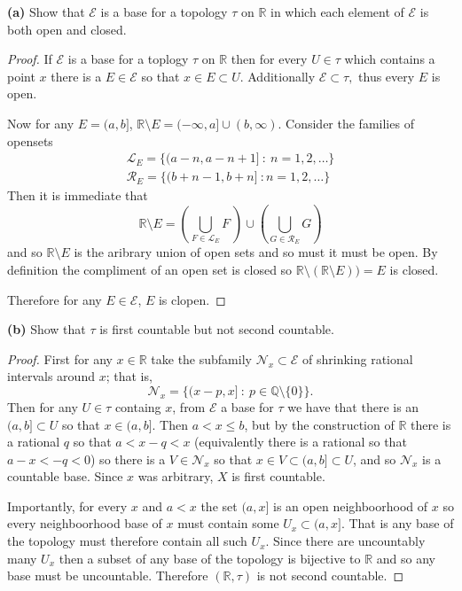 \documentclass[11pt]{amsart}
\theoremstyle{definition}
\numberwithin{theorem}{section}
\numberwithin{definition}{section}
\numberwithin{equation}{section}
\def\scripte{{\mathcal E}}
\def\scriptr{{\mathcal R}}
\def\scriptl{{\mathcal L}}
\def\scriptn{{\mathcal N}}
\begin{document}
 \textbf{(a)} Show that $\scripte$ is a base for a topology $\tau$ on $\mathbb{R}$ in which each element of $\scripte$ is both open and closed.
 \begin{proof}
 	If $\scripte$ is a base for a toplogy $\tau$ on $\mathbb{R}$ then for every $U \in \tau$ which contains a point $x$ there is a $E \in \scripte$ so that $x \in E \subset U$. Additionally $\scripte \subset \tau,$ thus every $E$ is open. 

 	Now for any $E= (a, b]$, $\mathbb{R} \setminus E = (-\infty, a] \cup (b, \infty).$ Consider the families of opensets 
 	\begin{equation*}
 		\begin{aligned}
 			\scriptl_E = \{(a - n, a -n +1]\ :\ n= 1, 2, \dots\} \\
 			\scriptr_E = \{(b +n -1, b+n]\ : n = 1, 2, \dots\}	
 		\end{aligned}
 	\end{equation*}
 	Then it is immediate that
 	\begin{equation*}
 		\mathbb{R} \setminus E = \left(\bigcup_{F \in \scriptl_E} F\ \right) \cup \left(\bigcup_{G \in \scriptr_E} G\right)
 	\end{equation*}
 	and so $\mathbb{R}\setminus E$ is the aribrary union of open sets and so must it must be open. By definition the compliment of an open set is closed so $\mathbb{R} \setminus (\mathbb{R} \setminus E)) = E$ is closed. 

 	Therefore for any $E \in \scripte$, $E$ is clopen.
 \end{proof}
\noindent \textbf{(b)} Show that $\tau$ is first countable but not second countable.
\begin{proof}
	First for any $x \in \mathbb{R}$ take the subfamily $\scriptn_x \subset \scripte$ of shrinking rational intervals around $x$; that is,
	\begin{equation*}
		\scriptn_x = \{(x-p, x]\ :\ p \in \mathbb{Q} \setminus\{0\}\}.
	\end{equation*}
	Then for any $U \in \tau$ containg $x$, from $\scripte$ a base for $\tau$ we have that there is an $(a, b] \subset U$ so that $x \in (a, b]$. Then $a < x \leq b$, but by the construction of $\mathbb{R}$ there is a rational $q$ so that $a < x - q < x$ (equivalently there is a rational so that $a-x < -q < 0$) so there is a $V \in \scriptn_x$ so that $x \in V \subset (a,b] \subset U$, and so $\scriptn_x$ is a countable base. Since $x$ was arbitrary, $X$ is first countable.

	Importantly, for every $x$  and $a < x$ the set $(a, x]$ is an open neighboorhood of $x$ so every neighboorhood base of $x$ must contain some $U_x \subset (a, x]$. That is any base of the topology must therefore contain all such $U_x$. Since there are uncountably many $U_x$ then a subset of any base of the topology is bijective to $\mathbb{R}$ and so any base must be uncountable. Therefore $(\mathbb{R}, \tau)$ is not second countable.
\end{proof}
\end{document}
